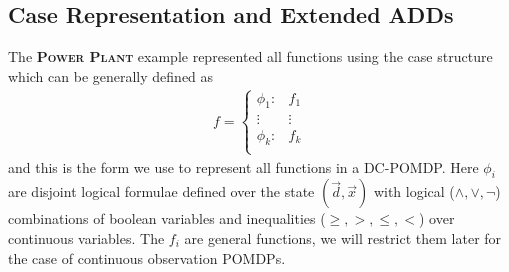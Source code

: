 \documentclass{article} %
\begin{document}
\subsection{Case Representation and Extended ADDs}
\label{sec:case}

The \textsc{\bf Power Plant} example represented all functions using
the case structure which can be generally defined as {\footnotesize
\vspace{-3mm}
\begin{align}
f = 
\begin{cases}
  \phi_1: & f_1 \\ 
 \vdots&\vdots\\ 
  \phi_k: & f_k \\ 
\end{cases} \nonumber
\end{align}
}
and this is the form we use to represent all functions in a DC-POMDP.
Here $\phi_i$ are disjoint logical formulae defined over the state $(\vec{d},\vec{x})$ with logical ($\land,\lor,\neg$) combinations of boolean variables and inequalities ($\geq,>,\leq,<$) over continuous variables.  
The $f_i$ are general functions, we will restrict them later for the
case of continuous observation POMDPs.
\end{document}
